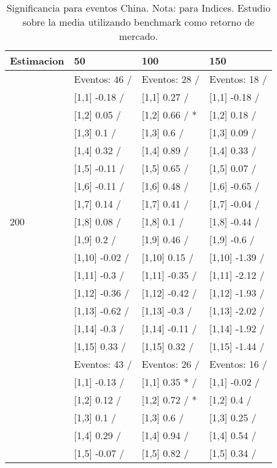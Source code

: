 \begin{table}

\caption{Significancia para eventos China. Nota: para Indices. Estudio sobre la media utilizando benchmark como retorno de mercado.}
\centering
\begin{tabular}[t]{llll}
\toprule
Estimacion & 50 & 100 & 150\\
\midrule
 & Eventos:  46 / & Eventos:  28 / & Eventos:  18 /\\
 & {}[1,1] -0.18  / & {}[1,1] 0.27  / & {}[1,1] -0.18  /\\
 & {}[1,2] 0.05  / & {}[1,2] 0.66  / * & {}[1,2] 0.18  /\\
 & {}[1,3] 0.1  / & {}[1,3] 0.6  / & {}[1,3] 0.09  /\\
 & {}[1,4] 0.32  / & {}[1,4] 0.89  / & {}[1,4] 0.33  /\\
\addlinespace
 & {}[1,5] -0.11  / & {}[1,5] 0.65  / & {}[1,5] 0.07  /\\
 & {}[1,6] -0.11  / & {}[1,6] 0.48  / & {}[1,6] -0.65  /\\
 & {}[1,7] 0.14  / & {}[1,7] 0.41  / & {}[1,7] -0.04  /\\
200 & {}[1,8] 0.08  / & {}[1,8] 0.1  / & {}[1,8] -0.44  /\\
 & {}[1,9] 0.2  / & {}[1,9] 0.46  / & {}[1,9] -0.6  /\\
\addlinespace
 & {}[1,10] -0.02  / & {}[1,10] 0.15  / & {}[1,10] -1.39  /\\
 & {}[1,11] -0.3  / & {}[1,11] -0.35  / & {}[1,11] -2.12  /\\
 & {}[1,12] -0.36  / & {}[1,12] -0.42  / & {}[1,12] -1.93  /\\
 & {}[1,13] -0.62  / & {}[1,13] -0.3  / & {}[1,13] -2.02  /\\
 & {}[1,14] -0.3  / & {}[1,14] -0.11  / & {}[1,14] -1.92  /\\
\addlinespace
 & {}[1,15] 0.33  / & {}[1,15] 0.32  / & {}[1,15] -1.44  /\\
 & Eventos:  43 / & Eventos:  26 / & Eventos:  16 /\\
 & {}[1,1] -0.13  / & {}[1,1] 0.35 * / & {}[1,1] -0.02  /\\
 & {}[1,2] 0.12  / & {}[1,2] 0.72  / * & {}[1,2] 0.4  /\\
 & {}[1,3] 0.1  / & {}[1,3] 0.6  / & {}[1,3] 0.25  /\\
\addlinespace
 & {}[1,4] 0.29  / & {}[1,4] 0.94  / & {}[1,4] 0.54  /\\
 & {}[1,5] -0.07  / & {}[1,5] 0.82  / & {}[1,5] 0.34  /\\

\end{tabular}
\end{table}
